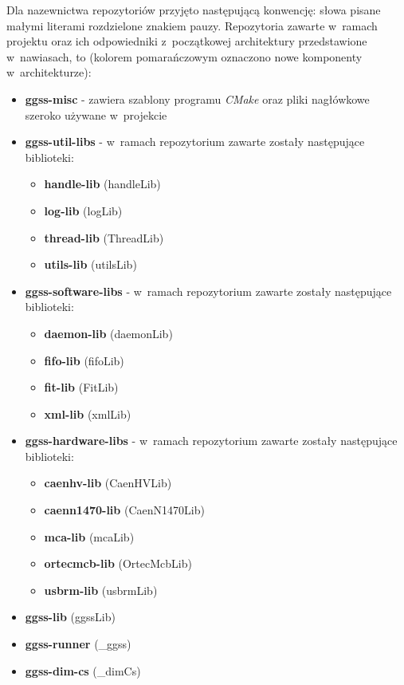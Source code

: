 Dla nazewnictwa repozytoriów przyjęto następującą konwencję: słowa pisane małymi literami rozdzielone znakiem pauzy. Repozytoria zawarte w~ramach projektu oraz ich odpowiedniki z~początkowej architektury przedstawione w~nawiasach, to (kolorem pomarańczowym oznaczono nowe komponenty w~architekturze):
\begin{itemize}
\item \color{orangei} \textbf{ggss-misc} \color{black} - zawiera szablony programu \textit{CMake} oraz pliki nagłówkowe szeroko używane w~projekcie
\item \color{orangei} \textbf{ggss-util-libs} \color{black} - w~ramach repozytorium zawarte zostały następujące biblioteki:
    \begin{itemize}
    \item \textbf{handle-lib} (handleLib)
    \item \textbf{log-lib} (logLib)
    \item \textbf{thread-lib} (ThreadLib)
    \item \textbf{utils-lib} (utilsLib)
    \end{itemize}
\item \color{orangei} \textbf{ggss-software-libs} \color{black} - w~ramach repozytorium zawarte zostały następujące biblioteki:
    \begin{itemize}
    \item \textbf{daemon-lib} (daemonLib) 
    \item \textbf{fifo-lib} (fifoLib)
    \item \textbf{fit-lib} (FitLib)
    \item \textbf{xml-lib} (xmlLib)
    \end{itemize}
\item \color{orangei} \textbf{ggss-hardware-libs} \color{black} - w~ramach repozytorium zawarte zostały następujące biblioteki:
    \begin{itemize}
    \item \textbf{caenhv-lib} (CaenHVLib)
    \item \textbf{caenn1470-lib} (CaenN1470Lib)
    \item \textbf{mca-lib} (mcaLib)
    \item \textbf{ortecmcb-lib} (OrtecMcbLib) 
    \item \textbf{usbrm-lib} (usbrmLib)
    \end{itemize}
\item \textbf{ggss-lib} (ggssLib)
\item \textbf{ggss-runner} (\_ggss)
\item \textbf{ggss-dim-cs} (\_dimCs)

\end{itemize}
